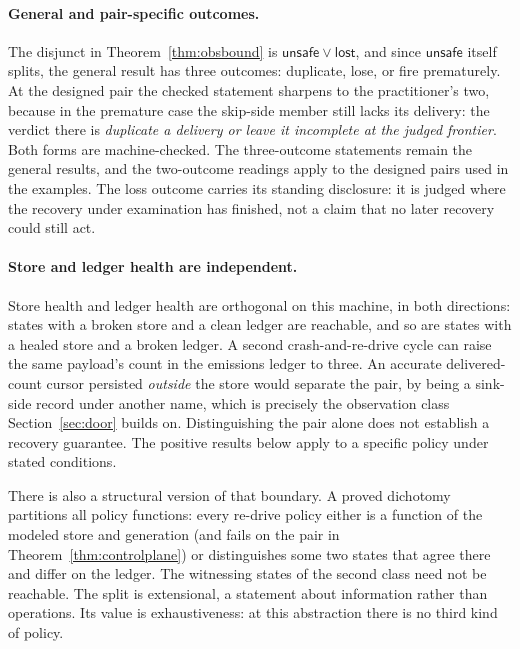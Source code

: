 \documentclass[sigplan,10pt]{acmart}
\theoremstyle{plain}
\theoremstyle{definition}
\newcommand{\unsafe}{\mathsf{unsafe}}
\newcommand{\lostp}{\mathsf{lost}}
\begin{document}
\paragraph{General and pair-specific outcomes.}
The disjunct in Theorem~\ref{thm:obsbound} is $\unsafe \vee \lostp$,
and since $\unsafe$ itself splits, the general result has three outcomes:
duplicate, lose, or fire prematurely. At the designed pair the
checked statement sharpens to the practitioner's two, because in the
premature case the skip-side member still lacks its delivery: the
verdict there is \emph{duplicate a delivery or leave it incomplete at the judged frontier}.
Both forms are machine-checked. The three-outcome statements remain
the general results, and the two-outcome readings apply to the designed
pairs used in the examples. The loss outcome carries
its standing disclosure: it is judged where the recovery under
examination has finished, not a claim that no later recovery could
still act.

\paragraph{Store and ledger health are independent.}
Store health and ledger health are orthogonal on this machine, in both
directions: states with a broken store and a clean ledger are
reachable, and so are states with a healed store and a broken ledger.
A second crash-and-re-drive cycle can raise the same payload's
count in the emissions ledger to three. An accurate delivered-count cursor
persisted \emph{outside} the
store would separate the pair, by being a sink-side record under
another name, which is precisely the observation class
Section~\ref{sec:door} builds on. Distinguishing the pair alone does not establish a recovery guarantee.
The positive results below apply to a specific policy under stated
conditions.

There is also a structural version of that boundary. A proved
dichotomy partitions all policy functions: every re-drive policy
either is a function of the modeled store and generation (and fails on the pair in
Theorem~\ref{thm:controlplane}) or distinguishes some two states
that agree there and differ on the ledger. The witnessing states of the
second class need not be reachable. The split is extensional, a
statement about information rather than operations. Its value is
exhaustiveness: at this abstraction there is no third kind of policy.
\end{document}
